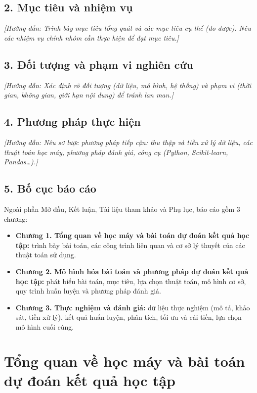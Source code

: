 \documentclass[12pt,a4paper,oneside]{report}
\newcommand{\tenbaitoan}{dự đoán kết quả học tập} %
\newcommand{\huongdan}[1]{{\color{guide}\itshape [Hướng dẫn: #1]}}
\begin{document}
\section*{2. Mục tiêu và nhiệm vụ}
\huongdan{Trình bày mục tiêu tổng quát và các mục tiêu cụ thể (đo được). Nêu
các nhiệm vụ chính nhóm cần thực hiện để đạt mục tiêu.}

\section*{3. Đối tượng và phạm vi nghiên cứu}
\huongdan{Xác định rõ đối tượng (dữ liệu, mô hình, hệ thống) và phạm vi
(thời gian, không gian, giới hạn nội dung) để tránh lan man.}

\section*{4. Phương pháp thực hiện}
\huongdan{Nêu sơ lược phương pháp tiếp cận: thu thập và tiền xử lý dữ liệu,
các thuật toán học máy, phương pháp đánh giá, công cụ (Python, Scikit-learn,
Pandas\dots).}

\section*{5. Bố cục báo cáo}
Ngoài phần Mở đầu, Kết luận, Tài liệu tham khảo và Phụ lục, báo cáo gồm
3 chương:
\begin{itemize}
  \item \textbf{Chương 1. Tổng quan về học máy và bài toán \tenbaitoan:} trình bày bài toán,
        các công trình liên quan và cơ sở lý thuyết của các thuật toán sử dụng.
  \item \textbf{Chương 2. Mô hình hóa bài toán và phương pháp \tenbaitoan:} phát biểu bài
        toán, mục tiêu, lựa chọn thuật toán, mô hình cơ sở, quy trình huấn
        luyện và phương pháp đánh giá.
  \item \textbf{Chương 3. Thực nghiệm và đánh giá:} dữ liệu thực nghiệm (mô
        tả, khảo sát, tiền xử lý), kết quả huấn luyện, phân tích, tối ưu và
        cải tiến, lựa chọn mô hình cuối cùng.
\end{itemize}

\chapter{Tổng quan về học máy và bài toán \tenbaitoan}
\label{chap:tongquan}
\end{document}

